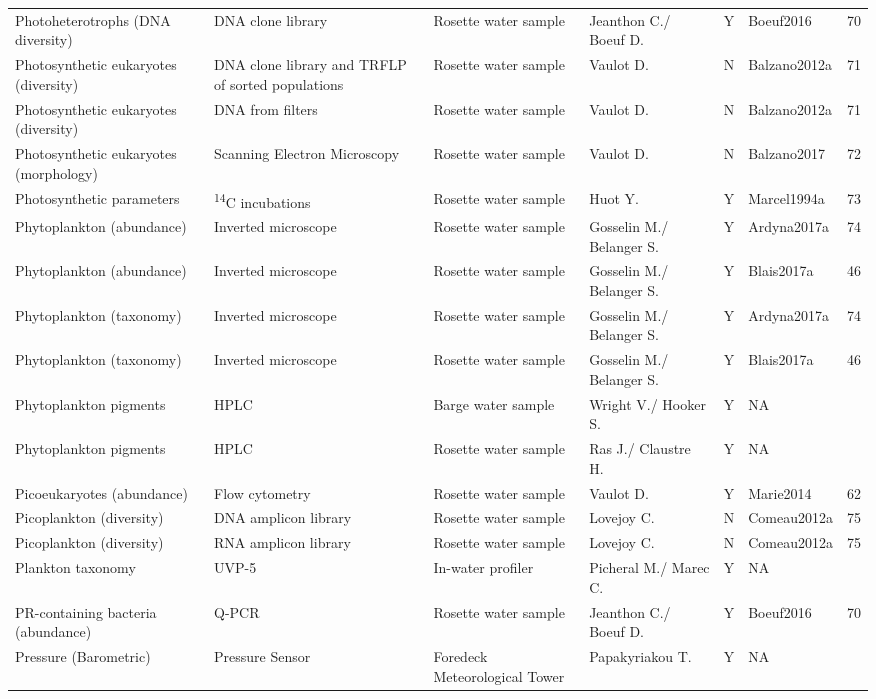 \begin{ThreePartTable}
\begin{longtable}[t]{lllllll}
Photoheterotrophs (DNA diversity) & DNA clone library & Rosette water sample & Jeanthon C./ Boeuf D. & Y & Boeuf2016 & 70\\
Photosynthetic  eukaryotes (diversity) & DNA clone library and TRFLP of sorted populations & Rosette water sample & Vaulot D. & N & Balzano2012a & 71\\
Photosynthetic  eukaryotes (diversity) & DNA from filters & Rosette water sample & Vaulot D. & N & Balzano2012a & 71\\
Photosynthetic eukaryotes (morphology) & Scanning Electron Microscopy & Rosette water sample & Vaulot D. & N & Balzano2017 & 72\\
\addlinespace
Photosynthetic parameters & \textsuperscript{14}C incubations & Rosette water sample & Huot Y. & Y & Marcel1994a & 73\\
Phytoplankton (abundance) & Inverted microscope & Rosette water sample & Gosselin M./ Belanger S. & Y & Ardyna2017a & 74\\
Phytoplankton (abundance) & Inverted microscope & Rosette water sample & Gosselin M./ Belanger S. & Y & Blais2017a & 46\\
Phytoplankton (taxonomy) & Inverted microscope & Rosette water sample & Gosselin M./ Belanger S. & Y & Ardyna2017a & 74\\
Phytoplankton (taxonomy) & Inverted microscope & Rosette water sample & Gosselin M./ Belanger S. & Y & Blais2017a & 46\\
\addlinespace
Phytoplankton pigments & HPLC & Barge water sample & Wright V./ Hooker S. & Y & NA & \\
Phytoplankton pigments & HPLC & Rosette water sample & Ras J./ Claustre H. & Y & NA & \\
Picoeukaryotes (abundance) & Flow cytometry & Rosette water sample & Vaulot D. & Y & Marie2014 & 62\\
Picoplankton (diversity) & DNA amplicon library & Rosette water sample & Lovejoy C. & N & Comeau2012a & 75\\
Picoplankton (diversity) & RNA amplicon library & Rosette water sample & Lovejoy C. & N & Comeau2012a & 75\\
\addlinespace
Plankton taxonomy & UVP-5 & In-water profiler & Picheral M./ Marec C. & Y & NA & \\
PR-containing bacteria (abundance) & Q-PCR & Rosette water sample & Jeanthon C./ Boeuf D. & Y & Boeuf2016 & 70\\
Pressure (Barometric) & Pressure Sensor & Foredeck Meteorological Tower & Papakyriakou T. & Y & NA & \\

\end{longtable}
\end{ThreePartTable}
